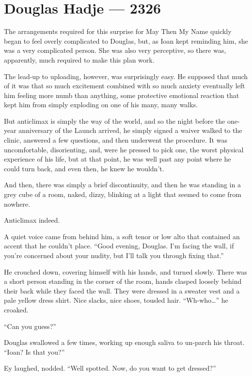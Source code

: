 \hypertarget{douglas-hadje-2326}{%
\chapter{Douglas Hadje — 2326}\label{douglas-hadje-2326}}

The arrangements required for this surprise for May Then My Name quickly began to feel overly complicated to Douglas, but, as Ioan kept reminding him, she was a very complicated person. She was also very perceptive, so there was, apparently, much required to make this plan work.

The lead-up to uploading, however, was surprisingly easy. He supposed that much of it was that so much excitement combined with so much anxiety eventually left him feeling more numb than anything, some protective emotional reaction that kept him from simply exploding on one of his many, many walks.

But anticlimax is simply the way of the world, and so the night before the one-year anniversary of the Launch arrived, he simply signed a waiver walked to the clinic, answered a few questions, and then underwent the procedure. It was uncomfortable, disorienting, and, were he pressed to pick one, the worst physical experience of his life, but at that point, he was well past any point where he could turn back, and even then, he knew he wouldn't.

And then, there was simply a brief discontinuity, and then he was standing in a grey cube of a room, naked, dizzy, blinking at a light that seemed to come from nowhere.

Anticlimax indeed.

A quiet voice came from behind him, a soft tenor or low alto that contained an accent that he couldn't place. ``Good evening, Douglas. I'm facing the wall, if you're concerned about your nudity, but I'll talk you through fixing that.''

He crouched down, covering himself with his hands, and turned slowly. There was a short person standing in the corner of the room, hands clasped loosely behind their back while they faced the wall. They were dressed in a sweater vest and a pale yellow dress shirt. Nice slacks, nice shoes, tousled hair. ``Wh-who\ldots{}'' he croaked.

``Can you guess?''

Douglas swallowed a few times, working up enough saliva to un-parch his throat. ``Ioan? Is that you?''

Ey laughed, nodded. ``Well spotted. Now, do you want to get dressed?''


